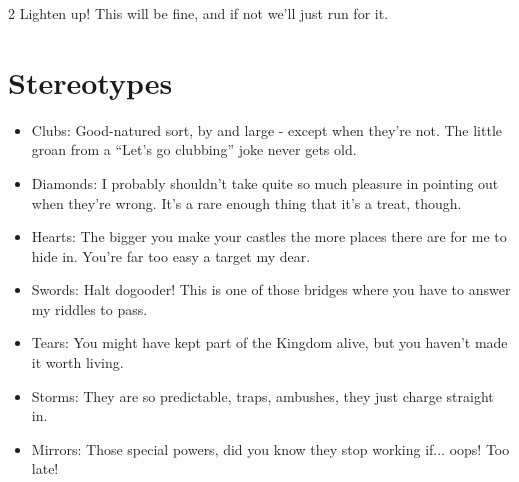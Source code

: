 \begin{multicols}{2}
Lighten up! This will be fine, and if not we'll just run for it.

\section*{Stereotypes}

\begin{itemize}

\item Clubs: Good-natured sort, by and large - except when they're not. The little groan from a “Let’s go clubbing” joke never gets old.
\item Diamonds: I probably shouldn't take quite so much pleasure in pointing out when they’re wrong. It’s a rare enough thing that it’s a treat, though.
\item Hearts: The bigger you make your castles the more places there are for me to hide in. You're far too easy a target my dear.
\item Swords: Halt dogooder! This is one of those bridges where you have to answer my riddles to pass.
\item Tears: You might have kept part of the Kingdom alive, but you haven't made it worth living. 
\item Storms: They are so predictable, traps, ambushes, they just charge straight in. 
\item Mirrors: Those special powers, did you know they stop working if... oops! Too late!


\end{itemize}
\end{multicols}
